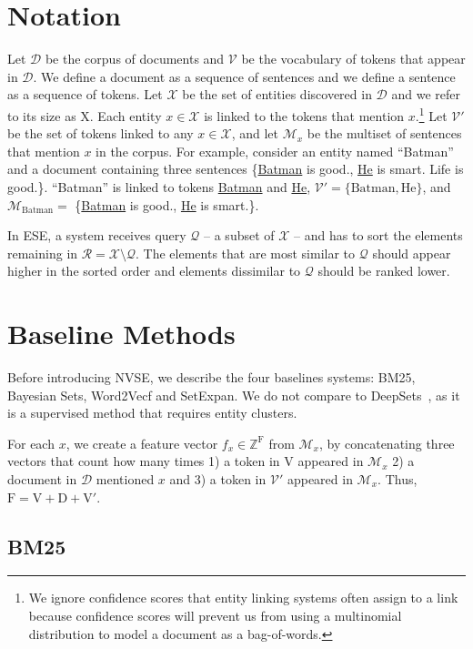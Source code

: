 \documentclass[a4paper]{article}
\newcommand{\XmQ}{\cX \setminus \cQ}
\newcommand{\cM}{\mathcal{M}}
\newcommand{\cQ}{\mathcal{Q}}
\newcommand{\cDoc}{\mathcal{D}}
\newcommand{\cVp}{\mathcal{V'}}
\newcommand{\cR}{\mathcal{R}}
\newcommand{\cV}{\mathcal{V}}
\newcommand{\cX}{\mathcal{X}}
\newcommand{\rDoc}{\mathrm{D}}
\newcommand{\rVp}{\mathrm{V'}}
\newcommand{\rF}{\mathrm{F}}
\newcommand{\rV}{\mathrm{V}}
\newcommand{\rX}{\mathrm{X}}
\newcommand{\wTv}{Word2Vecf\xspace}
\newcommand{\setX}{SetExpan\xspace}
\newcommand{\er}{ESE\xspace}
\newcommand{\erLong}{Entity Set Expansion\xspace}
\newcommand{\nvge}{NVSE\xspace}
\newcommand{\mycite}[1]{\cite{#1}}%
\begin{document}
\section{Notation}
\label{sec:notation}
Let $\cDoc$ be the corpus of documents and $\cV$ be the vocabulary of tokens that appear in $\cDoc$.  We define
a document as a sequence of sentences and we define a sentence as a sequence of tokens.
Let $\cX$ be the set of entities discovered in $\cDoc$ and we refer to its size as $\rX$.
Each entity $x \in \cX$ is linked to the tokens that mention $x$.\footnote{We ignore confidence scores that entity linking systems often assign to a link because confidence scores will prevent us from using a multinomial distribution to model a document as a bag-of-words.} 
Let $\cVp$ be the set of tokens linked to any $x \in \cX$,
and let $\cM_x$ be the multiset of sentences that mention $x$ in the corpus.
%
For example, consider an entity named ``Batman'' and a document containing three sentences
\{\underline{Batman} is good., \underline{He} is smart. Life is good.\}. ``Batman'' is linked to tokens \underline{Batman}
and \underline{He}, %
$\cVp = \{\text{Batman}, \text{He}\}$, and $\cM_{\text{Batman}} = $  \{\underline{Batman} is good., \underline{He} is smart.\}.


In \er, %
a system receives %
query $\cQ$ --
a subset of $\cX$ -- and has to sort the elements remaining in $\cR = \XmQ$.
The elements that are most similar to %
$\cQ$ should appear higher in the sorted order and elements dissimilar to $\cQ$ should be ranked lower.

\section{Baseline Methods}
Before introducing \nvge, we describe the four baselines systems: BM25, Bayesian Sets, \wTv and \setX. We do not compare to DeepSets~\mycite{manzil2017deep}, as it is a supervised method that requires entity clusters.

For each $x$, we create a feature vector $f_x \in \mathbb{Z}^{\rF}$ from $\cM_x$,
by concatenating three  vectors that count how many times
1) a token in $\rV$ appeared in $\cM_x$ 2) a document in $\cDoc$ mentioned $x$ and 3) a token in $\cVp$ appeared in $\cM_x$.
Thus, $\rF = \rV + \rDoc + \rVp$.

\subsection{BM25}
\end{document}
